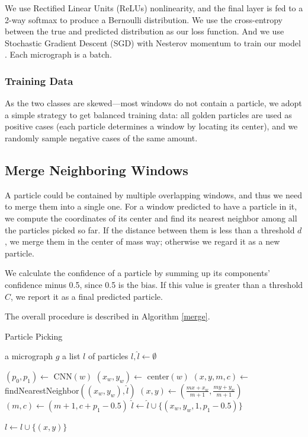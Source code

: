 \documentclass[11pt]{article}
\begin{document}
We use Rectified Linear Units (ReLUs) nonlinearity, and the final layer is fed to a 2-way softmax to produce a Bernoulli distribution. We use the cross-entropy between the true and predicted distribution as our loss function. And we use Stochastic Gradient Descent (SGD) with Nesterov momentum to train our model \cite{sutskever2013importance}. Each micrograph is a batch.

\subsubsection{Training Data}
As the two classes are skewed---most windows do not contain a particle, we adopt a simple strategy to get balanced training data: all golden particles are used as positive cases (each particle determines a window by locating its center), and we randomly sample negative cases of the same amount.

\subsection{Merge Neighboring Windows}
A particle could be contained by multiple overlapping windows, and thus we need to merge them into a single one. For a window predicted to have a particle in it, we compute the coordinates of its center and find its nearest neighbor among all the particles picked so far. If the distance between them is less than a threshold $d$, we merge them in the center of mass way; otherwise we regard it as a new particle.

We calculate the confidence of a particle by summing up its components' confidence minus 0.5, since 0.5 is the bias. If this value is greater than a threshold $C$, we report it as a final predicted particle.

The overall procedure is described in Algorithm \ref{merge}.

\begin{algorithm}[htbp]
\caption{Particle Picking}\label{merge}
\begin{algorithmic}[1]
\REQUIRE a micrograph $g$
\ENSURE a list $l$ of particles
\STATE $l,\hat l\leftarrow\emptyset$

    \STATE $(p_0, p_1)\leftarrow$ CNN$(w)$
        \STATE $(x_w,y_w)\leftarrow$ center$(w)$
        \STATE $(x,y,m,c)\leftarrow$ findNearestNeighbor$((x_w,y_w),\hat l)$
            \STATE $(x,y)\leftarrow (\frac{mx+x_w}{m+1}, \frac{my+y_w}{m+1})$
            \STATE $(m,c)\leftarrow (m+1,c+p_1-0.5)$
        \ELSE
            \STATE $\hat l\leftarrow \hat l\cup\{(x_w,y_w,1,p_1-0.5)\}$
        \ENDIF
    \ENDIF
\ENDFOR

        \STATE $l\leftarrow l\cup\{(x,y)\}$
    \ENDIF
\ENDFOR
\end{algorithmic}
\end{algorithm}
\end{document}
